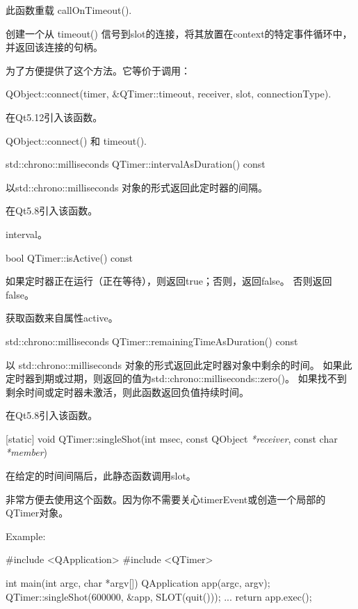 此函数重载 callOnTimeout().

创建一个从 timeout() 信号到slot的连接，将其放置在context的特定事件循环中，并返回该连接的句柄。

为了方便提供了这个方法。它等价于调用：


\begin{cppcode}
QObject::connect(timer, &QTimer::timeout, receiver, slot, connectionType).
\end{cppcode}
	
在Qt5.12引入该函数。
	
\begin{seeAlso}
QObject::connect() 和 timeout().
\end{seeAlso}

% 
std::chrono::milliseconds QTimer::intervalAsDuration() const

以std::chrono::milliseconds 对象的形式返回此定时器的间隔。

在Qt5.8引入该函数。

\begin{seeAlso}
interval。
\end{seeAlso}

bool QTimer::isActive() const

如果定时器正在运行（正在等待），则返回true；否则，返回false。 否则返回false。

\begin{notice}
获取函数来自属性active。
\end{notice}

std::chrono::milliseconds QTimer::remainingTimeAsDuration() const

以 std::chrono::milliseconds 对象的形式返回此定时器对象中剩余的时间。 
如果此定时器到期或过期，则返回的值为std::chrono::milliseconds::zero()。 
如果找不到剩余时间或定时器未激活，则此函数返回负值持续时间。

在Qt5.8引入该函数。

[static] void QTimer::singleShot(int msec, const QObject \emph{*receiver}, const char \emph{*member})

在给定的时间间隔后，此静态函数调用slot。

非常方便去使用这个函数。因为你不需要关心timerEvent或创造一个局部的QTimer对象。

\begin{cppcode}
Example:

#include <QApplication>
#include <QTimer>

int main(int argc, char *argv[])
{
	QApplication app(argc, argv);
	QTimer::singleShot(600000, &app, SLOT(quit()));
	...
	return app.exec();
}
\end{cppcode}

